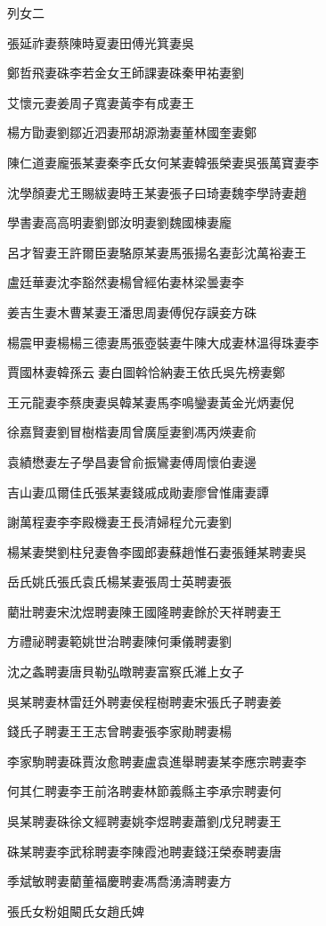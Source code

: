 
\begin{pinyinscope}
列女二

張延祚妻蔡陳時夏妻田傅光箕妻吳

鄭哲飛妻硃李若金女王師課妻硃秦甲祐妻劉

艾懷元妻姜周子寬妻黃李有成妻王

楊方勖妻劉鄒近泗妻邢胡源渤妻董林國奎妻鄭

陳仁道妻龐張某妻秦李氏女何某妻韓張榮妻吳張萬寶妻李

沈學顏妻尤王賜紱妻時王某妻張子曰琦妻魏李學詩妻趙

學書妻高高明妻劉鄧汝明妻劉魏國棟妻龐

呂才智妻王許爾臣妻駱原某妻馬張揚名妻彭沈萬裕妻王

盧廷華妻沈李豁然妻楊曾經佑妻林梁曇妻李

姜吉生妻木曹某妻王潘思周妻傅倪存謨妾方硃

楊震甲妻楊楊三德妻馬張壺裝妻牛陳大成妻林溫得珠妻李

賈國林妻韓孫云妻白圖斡恰納妻王依氏吳先榜妻鄭

王元龍妻李蔡庚妻吳韓某妻馬李鳴鑾妻黃金光炳妻倪

徐嘉賢妻劉冒樹楷妻周曾廣垕妻劉馮丙煐妻俞

袁績懋妻左子學昌妻曾俞振鸞妻傅周懷伯妻邊

吉山妻瓜爾佳氏張某妻錢戚成勛妻廖曾惟庸妻譚

謝萬程妻李李殿機妻王長清婦程允元妻劉

楊某妻樊劉柱兒妻魯李國郎妻蘇趙惟石妻張鍾某聘妻吳

岳氏姚氏張氏袁氏楊某妻張周士英聘妻張

藺壯聘妻宋沈煜聘妻陳王國隆聘妻餘於天祥聘妻王

方禮祕聘妻範姚世治聘妻陳何秉儀聘妻劉

沈之螽聘妻唐貝勒弘暾聘妻富察氏濰上女子

吳某聘妻林雷廷外聘妻侯程樹聘妻宋張氏子聘妻姜

錢氏子聘妻王王志曾聘妻張李家勛聘妻楊

李家駒聘妻硃賈汝愈聘妻盧袁進舉聘妻某李應宗聘妻李

何其仁聘妻李王前洛聘妻林節義縣主李承宗聘妻何

吳某聘妻硃徐文經聘妻姚李煜聘妻蕭劉戊兒聘妻王

硃某聘妻李武稌聘妻李陳霞池聘妻錢汪榮泰聘妻唐

季斌敏聘妻藺董福慶聘妻馮喬湧濤聘妻方

張氏女粉姐闞氏女趙氏婢


\end{pinyinscope}
